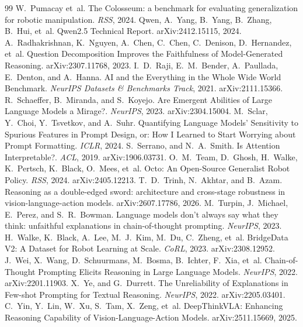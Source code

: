 \begin{thebibliography}{99}
 W.~Pumacay et~al. The Colosseum: a benchmark for evaluating generalization for robotic manipulation. \emph{RSS}, 2024.
 Qwen, A.~Yang, B.~Yang, B.~Zhang, B.~Hui, et~al. Qwen2.5 Technical Report. arXiv:2412.15115, 2024.
 A.~Radhakrishnan, K.~Nguyen, A.~Chen, C.~Chen, C.~Denison, D.~Hernandez, et~al. Question Decomposition Improves the Faithfulness of Model-Generated Reasoning. arXiv:2307.11768, 2023.
 I.~D.~Raji, E.~M.~Bender, A.~Paullada, E.~Denton, and A.~Hanna. AI and the Everything in the Whole Wide World Benchmark. \emph{NeurIPS Datasets \& Benchmarks Track}, 2021. arXiv:2111.15366.
 R.~Schaeffer, B.~Miranda, and S.~Koyejo. Are Emergent Abilities of Large Language Models a Mirage?. \emph{NeurIPS}, 2023. arXiv:2304.15004.
 M.~Sclar, Y.~Choi, Y.~Tsvetkov, and A.~Suhr. Quantifying Language Models' Sensitivity to Spurious Features in Prompt Design, or: How I Learned to Start Worrying about Prompt Formatting. \emph{ICLR}, 2024.
 S.~Serrano, and N.~A.~Smith. Is Attention Interpretable?. \emph{ACL}, 2019. arXiv:1906.03731.
 O.~M.~Team, D.~Ghosh, H.~Walke, K.~Pertsch, K.~Black, O.~Mees, et~al. Octo: An Open-Source Generalist Robot Policy. \emph{RSS}, 2024. arXiv:2405.12213.
 T.~D.~Trinh, N.~Akhtar, and B.~Azam. Reasoning as a double-edged sword: architecture and cross-stage robustness in vision-language-action models. arXiv:2607.17786, 2026.
 M.~Turpin, J.~Michael, E.~Perez, and S.~R.~Bowman. Language models don't always say what they think: unfaithful explanations in chain-of-thought prompting. \emph{NeurIPS}, 2023.
 H.~Walke, K.~Black, A.~Lee, M.~J.~Kim, M.~Du, C.~Zheng, et~al. BridgeData V2: A Dataset for Robot Learning at Scale. \emph{CoRL}, 2023. arXiv:2308.12952.
 J.~Wei, X.~Wang, D.~Schuurmans, M.~Bosma, B.~Ichter, F.~Xia, et~al. Chain-of-Thought Prompting Elicits Reasoning in Large Language Models. \emph{NeurIPS}, 2022. arXiv:2201.11903.
 X.~Ye, and G.~Durrett. The Unreliability of Explanations in Few-shot Prompting for Textual Reasoning. \emph{NeurIPS}, 2022. arXiv:2205.03401.
 C.~Yin, Y.~Lin, W.~Xu, S.~Tam, X.~Zeng, et~al. DeepThinkVLA: Enhancing Reasoning Capability of Vision-Language-Action Models. arXiv:2511.15669, 2025.

\end{thebibliography}
